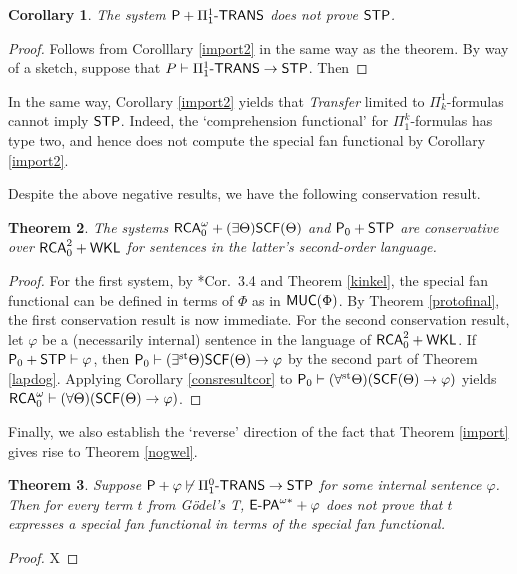 \documentclass[reqno]{amsart}
\newtheorem{thm}{Theorem}
\newtheorem{cor}[thm]{Corollary}
\def\STP{\textup{\textsf{STP}}}
\def\RCA{\textup{\textsf{RCA}}}
\def\WKL{\textup{\textsf{WKL}}}
\def\P{\textup{\textsf{P}}}
\def\MUC{\textup{\textsf{MUC}}}
\def\st{\textup{st}}
\def\di{\rightarrow}
\def\paai{\Pi_{1}^{0}\textup{-\textsf{TRANS}}}
\def\Paai{\Pi_{1}^{1}\textup{-\textsf{TRANS}}}
\def\SCF{\textup{\textsf{SCF}}}
\numberwithin{equation}{section}
\numberwithin{thm}{section}
\begin{document}
\begin{cor}\label{forqu}
The system $\P+\Paai$ does not prove $\STP$.  
\end{cor}
\begin{proof}
Follows from Corolllary \ref{import2} in the same way as the theorem.  By way of a sketch, suppose that $P\vdash \Paai\di \STP$.  Then  
\end{proof}
In the same way, Corollary \ref{import2} yields that \emph{Transfer} limited to $\Pi_{k}^{1}$-formulas cannot imply $\STP$.  
Indeed, the `comprehension functional' for $\Pi_{1}^{k}$-formulas has type two, and hence does not compute the special fan functional by Corollary \ref{import2}. 

\medskip

Despite the above negative results, we have the following conservation result.  %
\begin{thm}\label{conske}
The systems $\RCA^{\omega}_{0}+(\exists \Theta)\SCF(\Theta)$ and $\P_{0}+\STP$ are conservative over $\RCA_{0}^{2}+\WKL$ for sentences in the latter's second-order language.  
\end{thm}    
\begin{proof}
For the first system, by \cite{samGH}*{Cor.\ 3.4} and Theorem \ref{kinkel}, the special fan functional can be defined in terms of $\Phi$ as in $\MUC(\Phi)$.  
By Theorem \ref{protofinal}, the first conservation result is now immediate.  For the second conservation result, let $\varphi$ be a (necessarily internal) sentence in the language of $\RCA_{0}^{2}+\WKL$.  If $\P_{0}+\STP\vdash \varphi$, then $\P_{0}\vdash (\exists^{\st}\Theta)\SCF(\Theta)\di \varphi$ by the second part of Theorem \ref{lapdog}.  Applying Corollary \ref{consresultcor} to $\P_{0}\vdash (\forall^{\st}\Theta)(\SCF(\Theta)\di \varphi)$ yields $\RCA_{0}^{\omega}\vdash (\forall \Theta)(\SCF(\Theta)\di \varphi) $.  %
\end{proof}
Finally, we also establish the `reverse' direction of the fact that Theorem \ref{import} gives rise to Theorem \ref{nogwel}.  
\begin{thm}
Suppose $\P+\varphi\not\vdash \paai\di \STP$ for some internal sentence $\varphi$.  Then for every term $t$ from G\"odel's \textsf{\textup{T}},  $\textsf{\textup{E-PA}}^{\omega*}+\varphi$ does not prove that $t$ expresses a special fan functional in terms of the special fan functional.
\end{thm}
\begin{proof}
X
\end{proof}
\end{document}
